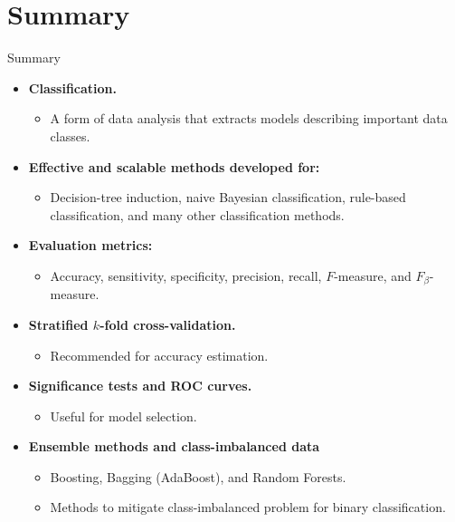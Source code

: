 \section{Summary}

\begin{frame}{Summary}
	\begin{itemize}
		\item \textbf{Classification.}
		      \begin{itemize}
			      \item A form of data analysis that extracts models describing important data classes.
		      \end{itemize}
		\item \textbf{Effective and scalable methods developed for:}
		      \begin{itemize}
			      \item Decision-tree induction, naive Bayesian classification, rule-based classification, and many other classification methods.
		      \end{itemize}
		\item \textbf{Evaluation metrics:}
		      \begin{itemize}
			      \item Accuracy, sensitivity, specificity, precision, recall, $F$-measure, and $F_\beta$-measure.
		      \end{itemize}
		\item \textbf{Stratified $k$-fold cross-validation.}
		      \begin{itemize}
			      \item Recommended for accuracy estimation.
		      \end{itemize}
		\item \textbf{Significance tests and ROC curves.}
		      \begin{itemize}
			      \item Useful for model selection.
		      \end{itemize}
		\item \textbf{Ensemble methods and class-imbalanced data}
		      \begin{itemize}
			      \item Boosting, Bagging (AdaBoost), and Random Forests.
			      \item Methods to mitigate class-imbalanced problem for binary classification.
		      \end{itemize}
	\end{itemize}
\end{frame}
